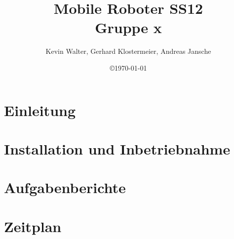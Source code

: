 \documentclass[a4paper,12pt]{scrartcl}[1970/01/01]
\title{Mobile Roboter SS12\\Gruppe x}
\author{Kevin Walter, Gerhard Klostermeier, Andreas Jansche}
\date{\copyright\space\today}
\begin{document}
\maketitle
\newpage

\tableofcontents
\newpage



\section{Einleitung}

\newpage

\section{Installation und Inbetriebnahme}

\newpage


\section{Aufgabenberichte}

\newpage

\section{Zeitplan}



%
\end{document}
